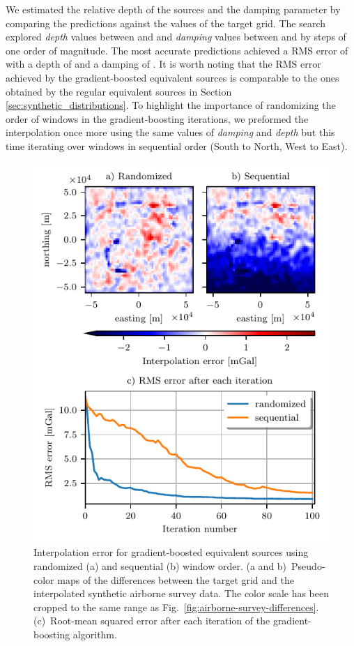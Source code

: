 We estimated the relative depth of the sources and the damping parameter by
comparing the predictions against the values of the target grid.
The search explored \emph{depth} values between \EqlBoostAirborneMinDepth{} and
\EqlBoostAirborneMaxDepth{} and \emph{damping} values between
\EqlBoostAirborneMinDamping{} and \EqlBoostAirborneMaxDamping{} by steps of one
order of magnitude.
The most accurate predictions achieved a RMS error of
\EqlBoostAirborneRmsScore{} with a depth of \EqlBoostAirborneDepth{} and
a damping of \EqlBoostAirborneDamping{}.
It is worth noting that the RMS error achieved by the gradient-boosted
equivalent sources is comparable to the ones obtained by the regular equivalent
sources in Section \ref{sec:synthetic_distributions}.
To highlight the importance of randomizing the order of windows in the
gradient-boosting iterations, we preformed the interpolation once more using
the same values of \emph{damping} and \emph{depth} but this time iterating over
windows in sequential order (South to North, West to East).

\begin{figure}[tb]
    \includegraphics[width=\linewidth]{figs/eql-gradient-boosted/eql-boost-airborne.pdf}
    \caption{
        Interpolation error for gradient-boosted equivalent sources using
        randomized (a) and sequential (b) window order.
        (a and b)~Pseudo-color maps of the differences between the target grid
        and the interpolated synthetic airborne survey data.
        The color scale has been cropped to the same range as
        Fig.~\ref{fig:airborne-survey-differences}.
        (c)~Root-mean squared error after each iteration of the
        gradient-boosting algorithm.
}
\label{fig:eql-boost-airborne}
\end{figure}

